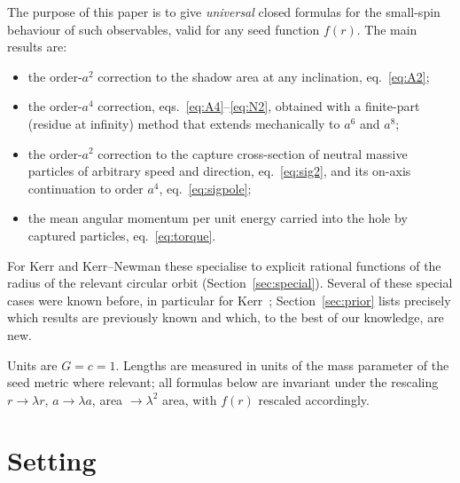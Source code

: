 \documentclass[11pt,a4paper]{article}
\theoremstyle{remark}
\numberwithin{equation}{section}
\begin{document}
The purpose of this paper is to give \emph{universal} closed formulas for the small-spin behaviour
of such observables, valid for any seed function $f(r)$. The main results are:
\begin{itemize}
\item the order-$a^2$ correction to the shadow area at any inclination, eq.~\eqref{eq:A2};
\item the order-$a^4$ correction, eqs.~\eqref{eq:A4}--\eqref{eq:N2}, obtained with a
finite-part (residue at infinity) method that extends mechanically to $a^6$ and $a^8$;
\item the order-$a^2$ correction to the capture cross-section of neutral massive particles of
arbitrary speed and direction, eq.~\eqref{eq:sig2}, and its on-axis continuation to order $a^4$,
eq.~\eqref{eq:sigpole};
\item the mean angular momentum per unit energy carried into the hole by captured particles,
eq.~\eqref{eq:torque}.
\end{itemize}
For Kerr and Kerr--Newman these specialise to explicit rational functions of the radius of the
relevant circular orbit (Section~\ref{sec:special}). Several of these special cases were known before, in
particular for Kerr~\cite{Bozza2006,GrallaLupsasca2020shape,KobialkoGaltsov2026,MachMomenniaSarbach2026}; Section~\ref{sec:prior}
lists precisely which results are previously known and which, to the best of our knowledge, are new.

Units are $G=c=1$. Lengths are measured in units of the mass parameter of the seed metric where
relevant; all formulas below are invariant under the rescaling $r\to\lambda r$, $a\to\lambda a$,
area $\to\lambda^2$ area, with $f(r)$ rescaled accordingly.

\section{Setting}\label{sec:setting}
\end{document}
